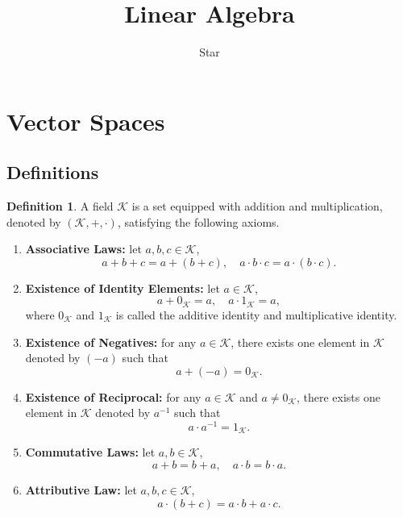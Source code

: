 \documentclass{ctexart}
\title{Linear Algebra}
\author{Star}
\begin{document}
	\maketitle
	\newpage
	\tableofcontents
	\renewcommand{\proofname}{Proof}
	\newpage
	\theoremstyle{definition}
	\newtheorem{mydef}{Definition}[subsection]
	\newtheorem{mypro}[mydef]{Proposition}
	\newtheorem{mythm}[mydef]{Theorem}
	\newtheorem{myrmk}[mydef]{Remark}
	\newtheorem{mynot}[mydef]{Notation}
	\newtheorem{myex}[mydef]{Example}
	\newtheorem{myax}[mydef]{Axiom}
	\newtheorem{mylma}[mydef]{Lemma}
    \newtheorem{mycor}[mydef]{Corollary}
	\newtheorem{mymthd}[mydef]{Method}
	\section{Vector Spaces}
	\subsection{Definitions}
	\begin{mydef}
		A field $\mathcal{K}$ is a set equipped with addition and multiplication, denoted by $(\mathcal{K}, +, \cdot)$, satisfying the following axioms.
		
		\begin{enumerate}
			\item \textbf{Associative Laws:} let $a,b,c \in \mathcal{K}$,
			\[
			a + b + c = a + (b + c), \quad a \cdot b \cdot c = a \cdot (b \cdot c).
			\]
			
			\item \textbf{Existence of Identity Elements:} let $a \in \mathcal{K}$,
			\[
			a + 0_{\mathcal{K}} = a, \quad a \cdot 1_{\mathcal{K}} = a,
			\]
			where $0_{\mathcal{K}}$ and $1_{\mathcal{K}}$ is called the additive identity and multiplicative identity.
			
			\item \textbf{Existence of Negatives:} for any $a \in \mathcal{K}$, there exists one element in $\mathcal{K}$ denoted by $(-a)$ such that
			\[
			a + (-a) = 0_{\mathcal{K}}.
			\]
			
			\item \textbf{Existence of Reciprocal:} for any $a \in \mathcal{K}$ and $a \neq 0_{\mathcal{K}}$, there exists one element in $\mathcal{K}$ denoted by $a^{-1}$ such that
			\[
			a \cdot a^{-1} = 1_{\mathcal{K}}.
			\]
			
			\item \textbf{Commutative Laws:} let $a,b \in \mathcal{K}$,
			\[
			a + b = b + a, \quad a \cdot b = b \cdot a.
			\]
			
			\item \textbf{Attributive Law:} let $a,b,c \in \mathcal{K}$,
			\[
			a \cdot (b + c) = a \cdot b + a \cdot c.
			\]
		\end{enumerate}
	\end{mydef}
	
\end{document}
